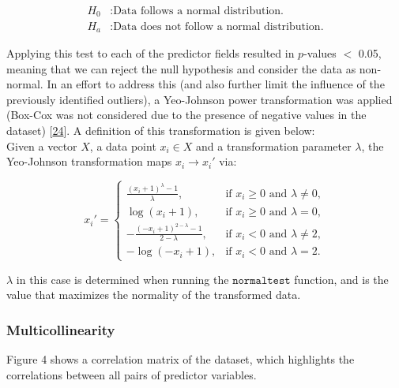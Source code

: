 \documentclass[11pt, oneside]{article}   	%
\begin{document}
\begin{align}
	H_0 &: \text{Data follows a normal distribution.} \\
	H_a &: \text{Data does not follow a normal distribution.}
\end{align}


Applying this test to each of the predictor fields resulted in $p$-values $<$ 0.05, meaning that we can reject the null hypothesis and consider the data as non-normal. In an effort to address this (and also further limit the influence of the previously identified outliers), a Yeo-Johnson power transformation was applied (Box-Cox was not considered due to the presence of negative values in the dataset) [\href{https://doi.org/10.1093/biomet/87.4.954}{24}]. A definition of this transformation is given below:\\

Given a vector $X$, a data point $x_i \in X$ and a transformation parameter $\lambda$, the Yeo-Johnson transformation maps $x_i \to x_i' $ via:

\begin{equation}
	x_i' =
	\begin{cases} 
		\frac{(x_i + 1)^\lambda - 1}{\lambda}, & \text{if } x_i \geq 0 \text{ and } \lambda \neq 0, \\
		\log(x_i + 1), & \text{if } x_i \geq 0 \text{ and } \lambda = 0, \\
		-\frac{(-x_i + 1)^{2 - \lambda} - 1}{2 - \lambda}, & \text{if } x_i < 0 \text{ and } \lambda \neq 2, \\
		-\log(-x_i + 1), & \text{if } x_i < 0 \text{ and } \lambda = 2.
	\end{cases}
\end{equation}

$ \lambda$ in this case is determined when running the $\texttt{normaltest}$ function, and is the value that maximizes the normality of the transformed data. 




\subsubsection{Multicollinearity}

Figure 4 shows a correlation matrix of the dataset, which highlights the correlations between all pairs of predictor variables. \\
\end{document}
